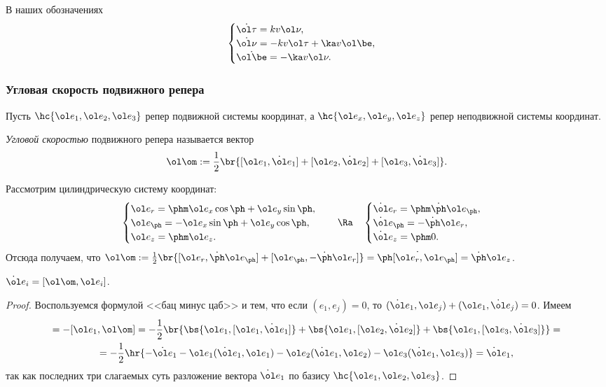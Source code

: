\documentclass[a4paper,12pt]{article}
\def\w{\ol\om}
\def\e{\ol e}
\def\vtau{\ol\tau}
\def\vnu{\ol\nu}
\def\d{\dot}
\begin{document}
\begin{imp} В наших обозначениях
$$
\begin{cases}
\d{\vtau}=kv\vnu,\\
\d{\vnu}=-kv\vtau+\ka v\ol\be,\\
\d{\ol\be}=-\ka v\vnu.
\end{cases}
$$
\end{imp}

\subsubsection{Угловая скорость подвижного репера}

Пусть $\hc{\e_1,\e_2,\e_3}$ репер подвижной системы координат,
а $\hc{\e_x,\e_y, \e_z}$ репер неподвижной системы координат.

\begin{df}
\emph{Угловой скоростью} подвижного репера называется вектор
$$\w:=\frac12\br{ [\e_1,\d\e_1]+ [\e_2,\d\e_2]+[\e_3,\d\e_3]}.$$
\end{df}

\begin{ex}
Рассмотрим цилиндрическую систему координат:
$$\begin{cases}
\e_r=\phm\e_x\cos\ph+\e_y\sin\ph,\\
\e_\ph=-\e_x\sin\ph+\e_y\cos\ph,\\
\e_z=\phm\e_z.
\end{cases}
\quad \Ra\quad
\begin{cases}
\d\e_r=\phm\d\ph\e_\ph,\\
\d\e_\ph=-\d\ph\e_r,\\
\d\e_z=\phm0.
\end{cases}
$$
Отсюда получаем, что $\w:=\frac12\br{[\e_r,\d\ph\e_\ph]+ [\e_\ph,-\d\ph\e_r]}= \d\ph[\e_r,\e_\ph] = \d\ph\e_z$.
\end{ex}

\begin{theorem}
$\d\e_i=[\w,\e_i]$.
\end{theorem}
\begin{proof}
Воспользуемся формулой <<бац минус цаб>> и тем, что если
$(e_1,e_j)=0$, то $(\d\e_1,\e_j)+(\e_1,\d\e_j)=0$.
Имеем
\begin{multline*}
[\w,\e_1]=-[\e_1,\w]=-\frac12\br{\bs{\e_1,[\e_1,\d\e_1]}+\bs{\e_1,[\e_2,\d\e_2]}+\bs{\e_1,[\e_3,\d\e_3]}}=\\
=-\frac12\hr{-\d{\e}_1-\e_1(\d\e_1,\e_1)-\e_2(\d\e_1,\e_2)-\e_3(\d\e_1,\e_3)}=\d\e_1,
\end{multline*}
так как последних три слагаемых суть разложение вектора $\d\e_1$
по базису $\hc{\e_1, \e_2, \e_3}$.
\end{proof}
\end{document}
